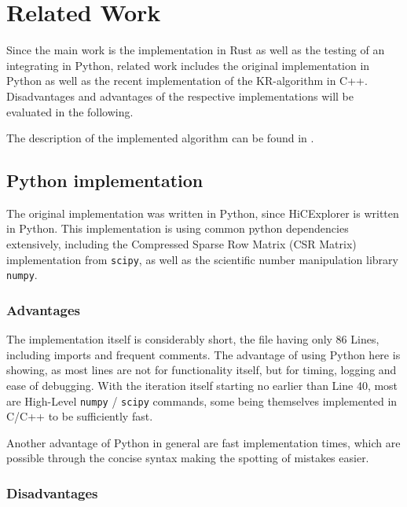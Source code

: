 \chapter{Related Work}\label{chap:relatedwork}


Since the main work is the implementation in Rust as well as the testing of an
integrating in Python, related work includes the original implementation in
Python as well as the recent implementation of the KR-algorithm in C++.
Disadvantages and advantages of the respective implementations will be
evaluated in the following.

The description of the implemented algorithm can be found in .


\section{Python implementation}\label{sec:python}

The original implementation was written in Python, since HiCExplorer is
written in Python. This implementation is using common python dependencies
extensively, including the Compressed Sparse Row Matrix (CSR Matrix)
implementation from \verb|scipy|, as well as the scientific number manipulation
library \verb|numpy|.

\subsection{Advantages}

The implementation itself is considerably short, the file having only 86 Lines,
including imports and frequent comments. The advantage of using Python here is
showing, as most lines are not for functionality itself, but for timing,
logging and ease of debugging. With the iteration itself starting no earlier
than Line 40, most are High-Level \verb|numpy| / \verb|scipy| commands, some
being themselves implemented in C/C++ to be sufficiently fast.

Another advantage of Python in general are fast implementation times, which are
possible through the concise syntax making the spotting of mistakes easier.

\subsection{Disadvantages}



